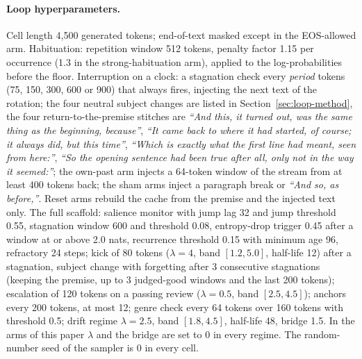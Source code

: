 \paragraph{Loop hyperparameters.} Cell length 4,500 generated tokens; end-of-text
masked except in the EOS-allowed arm. Habituation: repetition window 512
tokens, penalty factor 1.15 per occurrence (1.3 in the strong-habituation
arm), applied to the log-probabilities before the floor. Interruption on a
clock: a stagnation check every \emph{period} tokens (75, 150, 300, 600 or
900) that always fires, injecting the next text of the rotation; the four
neutral subject changes are listed in Section~\ref{sec:loop-method}, the four
return-to-the-premise stitches are \emph{``And this, it turned out, was the
same thing as the beginning, because''}, \emph{``It came back to where it had
started, of course; it always did, but this time''}, \emph{``Which is exactly
what the first line had meant, seen from here:''}, \emph{``So the opening
sentence had been true after all, only not in the way it seemed:''}; the own-past
arm injects a 64-token window of the stream from at least 400 tokens back;
the sham arms inject a paragraph break or \emph{``And so, as before,''}. Reset
arms rebuild the cache from the premise and the injected text only. The full
scaffold: salience monitor with jump lag 32 and jump threshold 0.55, stagnation
window 600 and threshold 0.08, entropy-drop trigger 0.45 after a window at or
above 2.0 nats, recurrence threshold 0.15 with minimum age 96, refractory 24
steps; kick of 80 tokens ($\lambda=4$, band $[1.2, 5.0]$, half-life 12) after
a stagnation, subject change with forgetting after 3 consecutive stagnations
(keeping the premise, up to 3 judged-good windows and the last 200 tokens);
escalation of 120 tokens on a passing review ($\lambda=0.5$, band $[2.5,
4.5]$); anchors every 200 tokens, at most 12; genre check every 64 tokens over
160 tokens with threshold 0.5; drift regime $\lambda=2.5$, band $[1.8, 4.5]$,
half-life 48, bridge 1.5. In the arms of this paper $\lambda$ and the bridge
are set to 0 in every regime. The random-number seed of the sampler is 0 in
every cell.

